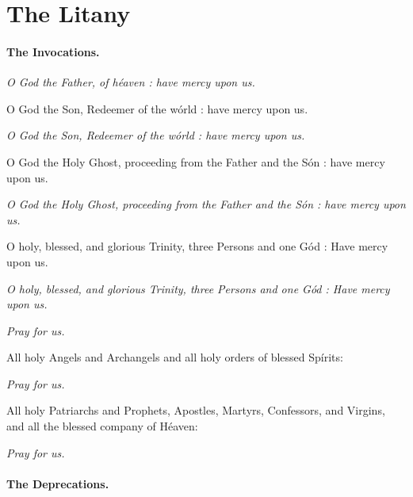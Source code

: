

\chapter{The Litany}


\subsubsection{The Invocations.}


\emph{O God the Father, of héaven : have mercy upon us.}

O God the Son, Redeemer of the wórld : have mercy upon us.

\emph{O God the Son, Redeemer of the wórld : have mercy upon us.}

O God the Holy Ghost, proceeding from the Father and the Són : have mercy upon us.

\emph{O God the Holy Ghost, proceeding from the Father and the Són : have mercy upon us.}

O holy, blessed, and glorious Trinity, three Persons and one Gód : Have mercy upon us.

\emph{O holy, blessed, and glorious Trinity, three Persons and one Gód : Have mercy upon us.}



\centerline{\emph{Pray for us.}}

All holy Angels and Archangels and all holy orders of blessed Spírits:

\centerline{\emph{Pray for us.}}

All holy Patriarchs and Prophets, Apostles, Martyrs, Confessors, and Virgins, and all the blessed company of Héaven:

\centerline{\emph{Pray for us.}}


\subsubsection{The Deprecations.}

